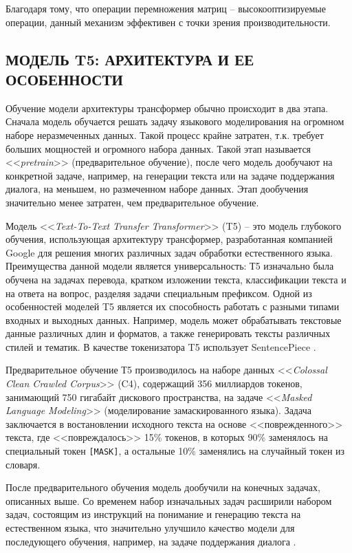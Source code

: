 Благодаря тому, что операции перемножения матриц -- высокооптизируемые операции, данный механизм эффективен с точки зрения производительности.

\subsection{МОДЕЛЬ T5: АРХИТЕКТУРА И ЕЕ ОСОБЕННОСТИ}
Обучение модели архитектуры трансформер обычно происходит в два этапа. Сначала модель обучается решать задачу языкового моделирования на огромном наборе неразмеченных данных. Такой процесс крайне затратен, т.к. требует больших мощностей и огромного набора данных. Такой этап называется <<\textit{pretrain}>> (предварительное обучение), после чего модель дообучают на конкретной задаче, например, на генерации текста или на задаче поддержания диалога, на меньшем, но размеченном наборе данных. Этап дообучения значительно менее затратен, чем предварительное обучение.

Модель <<\textit{Text-To-Text Transfer Transformer}>> (T5) -- это модель глубокого обучения, использующая архитектуру трансформер, разработанная компанией Google для решения многих различных задач обработки естественного языка. Преимущества данной модели является универсальность: Т5 изначально была обучена на задачах перевода, кратком изложении текста, классификации текста и на ответа на вопрос, разделяя задачи специальным префиксом. Одной из особенностей моделей T5 является их способность работать с разными типами входных и выходных данных. Например, модель может обрабатывать текстовые данные различных длин и форматов, а также генерировать тексты различных стилей и тематик. В качестве токенизатора T5 использует SentencePiece \cite{sentencepiece-paper}.

Предварительное обучение Т5 производилось на наборе данных <<\textit{Colossal Clean Crawled Corpus}>> (C4), содержащий 356 миллиардов токенов, занимающий 750 гигабайт дискового пространства, на задаче <<\textit{Masked Language Modeling}>> (моделирование замаскированного языка). Задача заключается в востановлении исходного текста на основе <<поврежденного>> текста, где <<повреждалось>> 15\% токенов, в которых 90\% заменялось на специальный токен \texttt{[MASK]}, а остальные 10\% заменялись на случайный токен из словаря.

После предварительного обучения модель дообучили на конечных задачах, описанных выше. Со временем набор изначальных задач расширили набором задач, состоящим из инструкций на понимание и генерацию текста на естественном языка, что значительно улучшило качество модели для последующего обучения, например, на задаче поддержания диалога \cite{flan-paper}.

